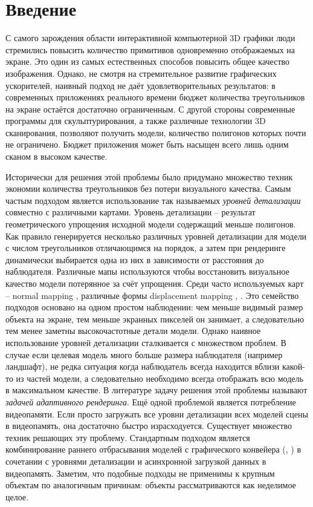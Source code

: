 
\section{Введение}
\label{sec:intro}
С самого зарождения области интерактивной компьютерной 3D графики люди стремились повысить количество примитивов одновременно отображаемых на экране. Это один из самых естественных способов повысить общее качество изображения. Однако, не смотря на стремительное развитие графических ускорителей, наивный подход не даёт удовлетворительных результатов: в современных приложениях реального времени бюджет количества треугольников на экране остаётся достаточно ограниченным. С другой стороны современные программы для скульптурирования, а также различные технологии 3D сканирования, позволяют получить модели, количество полигонов которых почти не ограничено. Бюджет приложения может быть насыщен всего лишь одним сканом в высоком качестве.

Исторически для решения этой проблемы было придумано множество техник экономии количества треугольников без потери визуального качества. Самым частым подходом является использование так называемых \emph{уровней детализации} совместно с различными картами. Уровень детализации -- результат геометрического упрощения исходной модели содержащий меньше полигонов. Как правило генерируется несколько различных уровней детализации для модели с числом треугольников отличающимся на порядок, а затем при рендеринге динамически выбирается одна из них в зависимости от расстояния до наблюдателя. Различные мапы используются чтобы восстановить визуальное качество модели потерянное за счёт упрощения. Среди часто используемых карт -- normal mapping \cite{normalmapping}, различные формы displacement mapping \cite{reliefmapping}, \cite{displacementmapping}. Это семейство подходов основано на одном простом наблюдении: чем меньше видимый размер объекта на экране, тем меньше экранных пикселей он занимает, а следовательно тем менее заметны высокочастотные детали модели. Однако наивное использование уровней детализации сталкивается с множеством проблем. В случае если целевая модель много больше размера наблюдателя (например ландшафт), не редка ситуация когда наблюдатель всегда находится вблизи какой-то из частей модели, а следовательно необходимо всегда отображать всю модель в максимальном качестве. В литературе задачу решения этой проблемы называют \emph{задачей адаптивного рендеринга}. Ещё одной проблемой является потребление видеопамяти. Если просто загружать все уровни детализации всех моделей сцены в видеопамять, она достаточно быстро израсходуется. Существует множество техник решающих эту проблему. Стандартным подходом является комбинирование раннего отбрасывания моделей с графического конвейера (\cite{frustum_culling}, \cite{coorg1997real}) в сочетании с уровнями детализации и асинхронной загрузкой данных в видеопамять. Заметим, что подобные подходы не применимы к крупным объектам по аналогичным причинам: объекты рассматриваются как неделимое целое.

